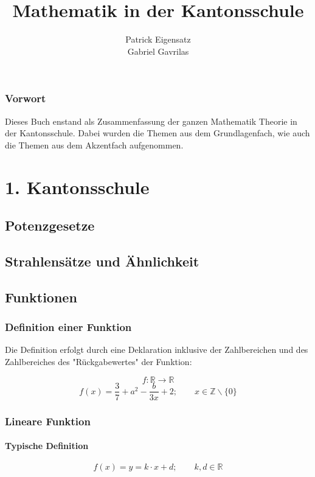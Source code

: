 \documentclass[12pt,a4paper]{scrbook}
\author{Patrick Eigensatz\\Gabriel Gavrilas}
\title{Mathematik in der Kantonsschule}
\begin{document}

\maketitle
\section*{Vorwort}
Dieses Buch enstand als Zusammenfassung der ganzen Mathematik Theorie in der Kantonsschule.
Dabei wurden die Themen aus dem Grundlagenfach, wie auch die Themen aus dem Akzentfach
aufgenommen.

\makeatletter
\renewcommand*\cleardoublepage{\clearpage\if@twoside
  \ifodd\c@page \hbox{}\newpage\if@twocolumn\hbox{}%
  \newpage\fi\fi\fi}
\makeatother

\tableofcontents
\newpage

\part{1. Kantonsschule}

\chapter{Potenzgesetze}


\chapter{Strahlensätze und Ähnlichkeit}


\chapter{Funktionen}
\section{Definition einer Funktion}
Die Definition erfolgt durch eine Deklaration inklusive
der Zahlbereichen und des Zahlbereiches des "Rückgabewertes" der Funktion:

\[ f : \mathbb{R} \rightarrow \mathbb{R}\]
\[ f(x) = \frac{3}{7} + a^2 - \frac{b}{3x} + 2; \quad\quad x \in \mathbb{Z}\backslash\{0\}\]

\section{Lineare Funktion}
\subsection{Typische Definition}
\[f(x) = y = k \cdot x + d; \quad\quad k, d \in \mathbb{R}\]
\end{document}
